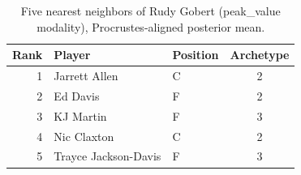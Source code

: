 \begin{table}[htbp]
  \centering\small
  \begin{tabular}{rllc}
    \toprule
    Rank & Player & Position & Archetype \\
    \midrule
    1 & Jarrett Allen & C & 2 \\
    2 & Ed Davis & F & 2 \\
    3 & KJ Martin & F & 3 \\
    4 & Nic Claxton & C & 2 \\
    5 & Trayce Jackson-Davis & F & 3 \\
    \bottomrule
  \end{tabular}
  \caption{Five nearest neighbors of Rudy Gobert (peak_value modality), Procrustes-aligned posterior mean.}
  \label{tab:Rudy_Gobert_neighbors_peak_value}
\end{table}

